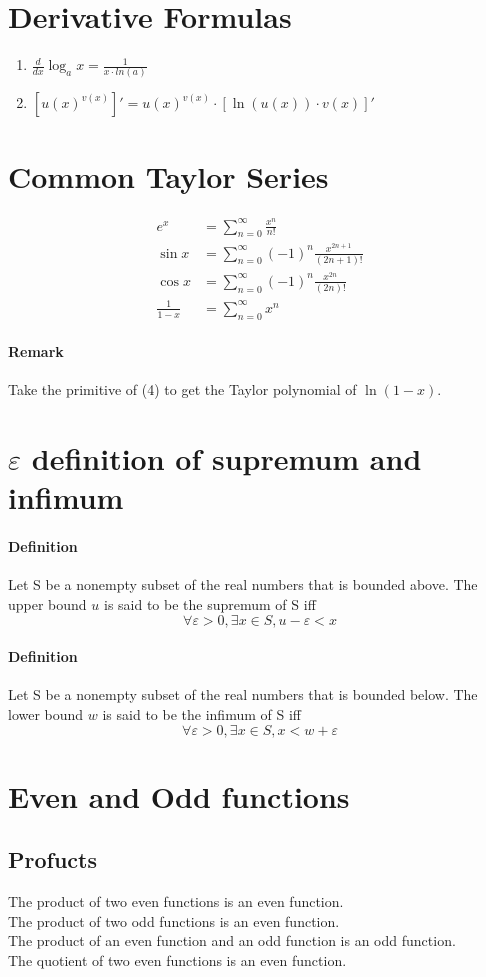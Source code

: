 \documentclass[11pt]{article}
\begin{document}
\section{Derivative Formulas}
\begin{enumerate}
	\item $\frac{d}{dx}\log_a{x} = \frac{1}{x \cdot ln(a)}$
	\item $[u(x)^{v(x)}]' = u(x)^{v(x)} \cdot [\ln(u(x))\cdot v(x)]'$
\end{enumerate}

\section{Common Taylor Series}
\begin{align}
	e^x &= \sum_{n=0}^{\infty}\frac{x^n}{n!}\\
	\sin{x} &= \sum_{n=0}^{\infty}(-1)^n\frac{x^{2n+1}}{(2n+1)!}\\
	\cos{x} &= \sum_{n=0}^{\infty}(-1)^n\frac{x^{2n}}{(2n)!}\\
	\frac{1}{1-x} &= \sum_{n=0}^{\infty}x^n
\end{align}
\paragraph{Remark}
Take the primitive of (4) to get the Taylor polynomial of $\ln(1-x)$.
\section{$\varepsilon$ definition of supremum and infimum}
\paragraph{Definition} Let S be a nonempty subset of the real numbers that is bounded above. The upper bound $u$ is said to be the supremum of S iff $$\forall \varepsilon >0, \exists x \in S, u - \varepsilon < x$$
\paragraph{Definition} Let S be a nonempty subset of the real numbers that is bounded below. The lower bound $w$ is said to be the infimum of S iff $$\forall \varepsilon >0, \exists x \in S, x < w + \varepsilon$$
\section{Even and Odd functions}
\subsection{Profucts}
The product of two even functions is an even function. \\
The product of two odd functions is an even function. \\
The product of an even function and an odd function is an odd function.\\
The quotient of two even functions is an even function.
\end{document}
